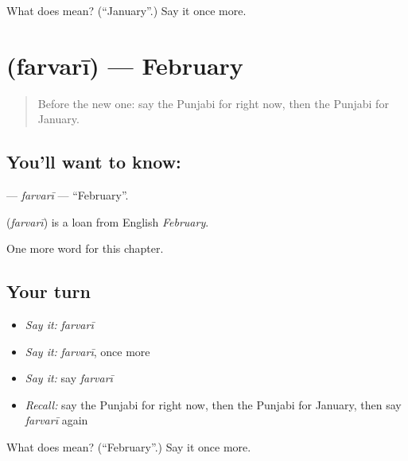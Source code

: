 \begin{tcolorbox}[breakable,colback=teal!4,colframe=teal!35!black,title={Before you move on}]
What does  mean? (\textquotedblleft{}January\textquotedblright{}.) Say it once more.
\end{tcolorbox}
\section[\texorpdfstring{\pa{ਫ਼ਰਵਰੀ} (farvarī)}{ਫ਼ਰਵਰੀ (farvarī)}]{ (farvarī) — February}

\label{lesson:PA-C101-farvari}



\begin{quote}
Before the new one: say the Punjabi for right now, then the Punjabi for January.
\end{quote}

\subsection*{You'll want to know: }
\textbf{} — \emph{farvarī} — \textquotedblleft{}February\textquotedblright{}.

\begin{cousinweb}
\textbf{} (\emph{farvarī}) is a loan from English \emph{February}.
\end{cousinweb}

\begin{grammarlens}[title={What you've built}]
One more word for this chapter.
\end{grammarlens}

\subsection*{Your turn}
\begin{itemize}
\raggedright
  \item \emph{Say it:} \emph{farvarī}
  \item \emph{Say it:} \emph{farvarī}, once more
  \item \emph{Say it:} say \emph{farvarī}
  \item \emph{Recall:} say the Punjabi for right now, then the Punjabi for January, then say \emph{farvarī} again
\end{itemize}

\begin{tcolorbox}[breakable,colback=teal!4,colframe=teal!35!black,title={Before you move on}]
What does  mean? (\textquotedblleft{}February\textquotedblright{}.) Say it once more.
\end{tcolorbox}

